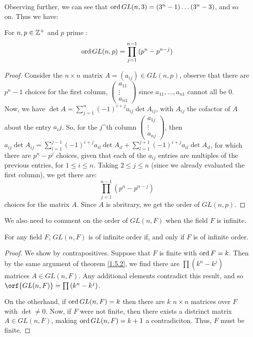 Observing further, we can see that $\operatorname{ord}{GL(n,3)}=(3^n-1) \dots (3^n-3)$, and so
on. Thus we have:

\begin{theorem}\label{1.5.2}
    For $n, p \in \mathbb{Z}^+$ and  $p$ prime :
    \begin{equation}
        \operatorname{ord}{GL(n,p)}=\prod_{j=1}^{n-1}{(p^n-p^{n-j})}
    \end{equation}
\end{theorem}
\begin{proof}
    Consider the $n \times n$ matrix  $A=(a_{ij}) \in GL(n,p)$, observe that
    there are $p^n-1$ choices for the first column, $\begin{pmatrix}a_{11} \\
    \vdots \\ a_{n1}\end{pmatrix}$ since $a_{11}, \dots, a_{n1}$ cannot all be
    $0$. Now, we have $\det{A}=\sum_{j=1}^n{(-1)^{i+j}a_{ij}\det{A_{ij}}}$, with
    $A_{ij}$ the cofactor of $A$ about the entry $a_ij$. So, for the $j$^{th}
    column $\begin{pmatrix}a_{1j} \\ \vdots \\ a_{nj}\end{pmatrix}$, then
    $a_{ij}\det{A_{ij}}=\sum_{l=1}^{j-1}{(-1)^{i+j}a_{il}\det{A_{il}}}+
    \sum_{l=1}^{j+1}{(-1)^{i+j}a_{il}\det{A_{il}}}$, for which there are
    $p^n-p^j$ choices, given that each of the  $a_{ij}$ entries are multiples of
    the previous entries, for $1 \leq i \leq n$. Taking $2 \leq j \leq n$
    (since we already evaluated the first column), we get there are:
    \begin{equation*}
        \prod_{j=1}^{n-1}{(p^n-p^{n-j})}
    \end{equation*}
    choices for the matrix $A$. Since  $A$ is abritrary, we get the order of
    $GL(n,p)$.
\end{proof}

We also need to comment on the order of $GL(n,F)$ when the field $F$ is
infinite.

\begin{theorem}\label{1.5.3}
    For any field $F$,  $GL(n,F)$ is of infinite order if, and only if $F$ is
    of infinite order.
\end{theorem}
\begin{proof}
    We show by contrapositives. Suppose that $F$ is finite with  $\operatorname{ord}{F}=k$.
    Then by the same argument of theorem \ref{1.5.2}, we find there are
    $\prod{(k^n-k^j)}$ matrices $A \in GL(n,F)$. Any additional elements
    contradict this result, and so $\orf{GL(n,F)}=\prod{(k^n-k^j)}$.

    On the otherhand, if $\operatorname{ord}{GL(n,F)}=k$ then there are $k$ $n \times n$
    matrices over  $F$ with $\det \neq 0$. Now, if  $F$ were not finite, then
    there exists a distrinct matrix  $A \in GL(n,F)$, making $\operatorname{ord}{GL(n,F)}=k+1$
    a contradiciton. Thus, $F$ must be finite.
\end{proof}

